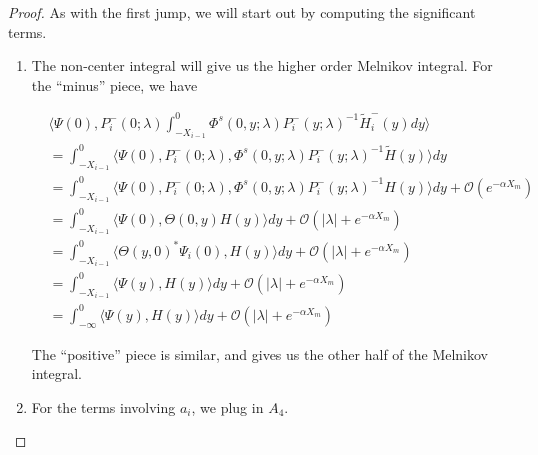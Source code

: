 \documentclass[thesis.tex]{subfiles}
\begin{document}
\begin{lemma}
\begin{proof}
As with the first jump, we will start out by computing the significant terms.

\begin{enumerate}
\item The non-center integral will give us the higher order Melnikov integral. For the ``minus'' piece, we have

\begin{align*}
&\langle \Psi(0), P_i^-(0; \lambda) \int_{-X_{i-1}}^0 \Phi^s(0, y; \lambda) P_i^-(y; \lambda)^{-1} \tilde{H}_i^-(y) dy \rangle \\
&= \int_{-X_{i-1}}^0 \langle \Psi(0), P_i^-(0; \lambda), \Phi^s(0, y; \lambda) P_i^-(y; \lambda)^{-1} \tilde{H}(y) \rangle dy \\
&= \int_{-X_{i-1}}^0 \langle \Psi(0), P_i^-(0; \lambda), \Phi^s(0, y; \lambda) P_i^-(y; \lambda)^{-1} H(y) \rangle dy + \mathcal{O}({e^{-\alpha X_m}})\\
&= \int_{-X_{i-1}}^0 \langle \Psi(0), \Theta(0, y) H(y) \rangle dy + \mathcal{O}(|\lambda| + {e^{-\alpha X_m}})\\
&= \int_{-X_{i-1}}^0 \langle \Theta(y, 0)^* \Psi_i(0), H(y) \rangle dy + \mathcal{O}(|\lambda| + {e^{-\alpha X_m}})\\
&= \int_{-X_{i-1}}^0 \langle \Psi(y), H(y) \rangle dy + \mathcal{O}(|\lambda| + {e^{-\alpha X_m}})\\
&= \int_{-\infty}^0 \langle \Psi(y), H(y) \rangle dy + \mathcal{O}(|\lambda| + {e^{-\alpha X_m}})
\end{align*}

The ``positive'' piece is similar, and gives us the other half of the Melnikov integral.

\item For the terms involving $a_i$, we plug in $A_4$.


\end{enumerate}
\end{proof}
\end{lemma}
\end{document}
